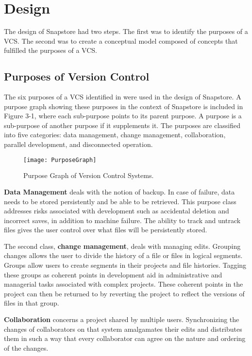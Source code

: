 \chapter{Design}

The design of Snapstore had two steps. The first was to identify the purposes of a VCS. The second was to create a conceptual model composed of concepts that fulfilled the purposes of a VCS.

\section{Purposes of Version Control}

The six purposes of a VCS identified in \cite{RossoJackson} were used in the design of Snapstore. A purpose graph showing these purposes in the context of Snapstore is included in Figure 3-1, where each sub-purpose points to its parent purpose. A purpose is a sub-purpose of another purpose if it supplements it. The purposes are classified into five categories: data management, change management, collaboration, parallel development, and disconnected operation.

\begin{figure}
\begin{center}
\texttt{[image: PurposeGraph]}
\end{center}
\caption{Purpose Graph of Version Control Systems.}
\label{arm:fig1}
\end{figure}

\textbf{Data Management} deals with the notion of backup. In case of failure, data needs to be stored persistently and be able to be retrieved. This purpose class addresses risks associated with development such as accidental deletion and incorrect saves, in addition to machine failure. The ability to track and untrack files gives the user control over what files will be persistently stored.

The second class, \textbf{change management}, deals with managing edits. Grouping changes allows the user to divide the history of a file or files in logical segments. Groups allow users to create segments in their projects and file histories. Tagging these groups as coherent points in development aid in administrative and managerial tasks associated with complex projects. These coherent points in the project can then be returned to by reverting the project to reflect the versions of files in that group.

\textbf{Collaboration} concerns a project shared by multiple users. Synchronizing the changes of collaborators on that system amalgamates their edits and distributes them in such a way that every collaborator can agree on the nature and ordering of the changes.

